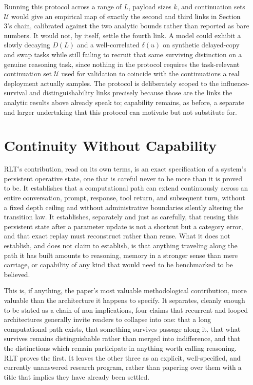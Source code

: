 \documentclass[11pt]{article}
\begin{document}
Running this protocol across a range of $L$, payload sizes $k$, and continuation sets $\mathcal U$ would give an empirical map of exactly the second and third links in Section 3's chain, calibrated against the two analytic bounds rather than reported as bare numbers. It would not, by itself, settle the fourth link. A model could exhibit a slowly decaying $D(L)$ and a well-correlated $\delta(u)$ on synthetic delayed-copy and swap tasks while still failing to recruit that same surviving distinction on a genuine reasoning task, since nothing in the protocol requires the task-relevant continuation set $\mathcal U$ used for validation to coincide with the continuations a real deployment actually samples. The protocol is deliberately scoped to the influence-survival and distinguishability links precisely because those are the links the analytic results above already speak to; capability remains, as before, a separate and larger undertaking that this protocol can motivate but not substitute for.

\section{Continuity Without Capability}

RLT's contribution, read on its own terms, is an exact specification of a system's persistent operative state, one that is careful never to be more than it is proved to be. It establishes that a computational path can extend continuously across an entire conversation, prompt, response, tool return, and subsequent turn, without a fixed depth ceiling and without administrative boundaries silently altering the transition law. It establishes, separately and just as carefully, that reusing this persistent state after a parameter update is not a shortcut but a category error, and that exact replay must reconstruct rather than reuse. What it does not establish, and does not claim to establish, is that anything traveling along the path it has built amounts to reasoning, memory in a stronger sense than mere carriage, or capability of any kind that would need to be benchmarked to be believed.

This is, if anything, the paper's most valuable methodological contribution, more valuable than the architecture it happens to specify. It separates, cleanly enough to be stated as a chain of non-implications, four claims that recurrent and looped architectures generally invite readers to collapse into one: that a long computational path exists, that something survives passage along it, that what survives remains distinguishable rather than merged into indifference, and that the distinctions which remain participate in anything worth calling reasoning. RLT proves the first. It leaves the other three as an explicit, well-specified, and currently unanswered research program, rather than papering over them with a title that implies they have already been settled.
\end{document}
